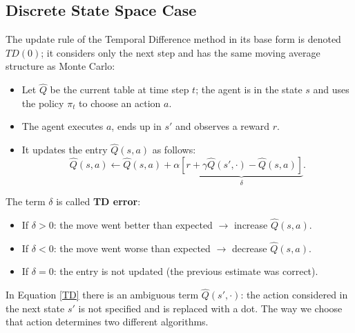 \documentclass[10pt, a4paper]{report}
\begin{document}
\subsection{Discrete State Space Case}
The update rule of the Temporal Difference method in its base form is denoted $TD(0)$; it considers only the next step and has the same moving average structure as Monte Carlo:
\begin{itemize}
    \item Let $\hat Q$ be the current table at time step $t$; the agent is in the state $s$ and uses the policy $\pi_t$ to choose an action $a$.
    \item The agent executes $a$, ends up in $s'$ and observes a reward $r$.
    \item It updates the entry $\hat Q(s,a)$ as follows:
    \begin{equation}\label{TD}
        \boxed{
            \hat Q(s,a) \leftarrow \hat Q(s,a) + \alpha
            \underbrace{\left[
                r + \gamma \hat Q(s', \cdot) - \hat Q(s,a)
            \right]}_{\delta}
        }.
    \end{equation}
\end{itemize}
The term $\delta$ is called \textbf{TD error}:
\begin{itemize}
    \item If $\delta > 0$: the move went better than expected $\rightarrow$ increase $\hat Q(s,a)$.
    \item If $\delta < 0$: the move went worse than expected $\rightarrow$ decrease $\hat Q(s,a)$.
    \item If $\delta = 0$: the entry is not updated (the previous estimate was correct).
\end{itemize}
\begin{boxobservation}{}{}
    In Equation \eqref{TD} there is an ambiguous term $\hat Q(s', \cdot)$: the action considered in the next state $s'$ is not specified and is replaced with a dot. The way we choose that action determines two different algorithms.
\end{boxobservation}
\end{document}
